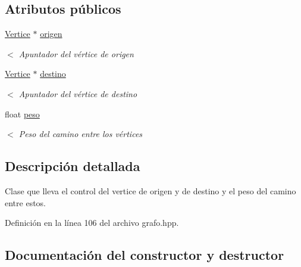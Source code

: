 \subsection*{Atributos públicos}
\begin{DoxyCompactItemize}
\item 
\mbox{\label{classArista_a9eb724ff0d46897de85b760d36a2e6b4}} 
\hyperlink{classVertice}{Vertice} $\ast$ \hyperlink{classArista_a9eb724ff0d46897de85b760d36a2e6b4}{origen}
\begin{DoxyCompactList}\small\item\em $<$ Apuntador del vértice de origen \end{DoxyCompactList}\item 
\mbox{\label{classArista_a7cc7d54b1945783a426f5251026af702}} 
\hyperlink{classVertice}{Vertice} $\ast$ \hyperlink{classArista_a7cc7d54b1945783a426f5251026af702}{destino}
\begin{DoxyCompactList}\small\item\em $<$ Apuntador del vértice de destino \end{DoxyCompactList}\item 
\mbox{\label{classArista_a371fdf684b589d3b3d842ad5ae338342}} 
float \hyperlink{classArista_a371fdf684b589d3b3d842ad5ae338342}{peso}
\begin{DoxyCompactList}\small\item\em $<$ Peso del camino entre los vértices \end{DoxyCompactList}\end{DoxyCompactItemize}


\subsection{Descripción detallada}
Clase que lleva el control del vertice de \textquotesingle{}origen\textquotesingle{} y de \textquotesingle{}destino\textquotesingle{} y el peso del camino entre estos. 

Definición en la línea 106 del archivo grafo.\+hpp.



\subsection{Documentación del constructor y destructor}
\mbox{\label{classArista_abfc5e334e70240f90b0f8d0cc094ad40}} 
